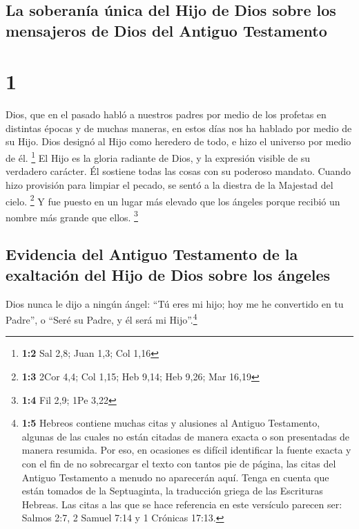 \hypertarget{la-soberanuxeda-uxfanica-del-hijo-de-dios-sobre-los-mensajeros-de-dios-del-antiguo-testamento}{%
\subsection{La soberanía única del Hijo de Dios sobre los mensajeros de
Dios del Antiguo
Testamento}\label{la-soberanuxeda-uxfanica-del-hijo-de-dios-sobre-los-mensajeros-de-dios-del-antiguo-testamento}}

\hypertarget{section}{%
\section{1}\label{section}}

 Dios, que en el pasado habló a nuestros padres por medio
de los profetas en distintas épocas y de muchas maneras, 
en estos días nos ha hablado por medio de su Hijo. Dios designó al Hijo
como heredero de todo, e hizo el universo por medio de él. \footnote{\textbf{1:2}
  Sal 2,8; Juan 1,3; Col 1,16}  El Hijo es la gloria
radiante de Dios, y la expresión visible de su verdadero carácter. Él
sostiene todas las cosas con su poderoso mandato. Cuando hizo provisión
para limpiar el pecado, se sentó a la diestra de la Majestad del cielo.
\footnote{\textbf{1:3} 2Cor 4,4; Col 1,15; Heb 9,14; Heb 9,26; Mar 16,19}
 Y fue puesto en un lugar más elevado que los ángeles
porque recibió un nombre más grande que ellos. \footnote{\textbf{1:4}
  Fil 2,9; 1Pe 3,22}

\hypertarget{evidencia-del-antiguo-testamento-de-la-exaltaciuxf3n-del-hijo-de-dios-sobre-los-uxe1ngeles}{%
\subsection{Evidencia del Antiguo Testamento de la exaltación del Hijo
de Dios sobre los
ángeles}\label{evidencia-del-antiguo-testamento-de-la-exaltaciuxf3n-del-hijo-de-dios-sobre-los-uxe1ngeles}}

 Dios nunca le dijo a ningún ángel: ``Tú eres mi hijo; hoy
me he convertido en tu Padre'', o ``Seré su Padre, y él será mi
Hijo''.\footnote{\textbf{1:5} Hebreos contiene muchas citas y alusiones
  al Antiguo Testamento, algunas de las cuales no están citadas de
  manera exacta o son presentadas de manera resumida. Por eso, en
  ocasiones es difícil identificar la fuente exacta y con el fin de no
  sobrecargar el texto con tantos pie de página, las citas del Antiguo
  Testamento a menudo no aparecerán aquí. Tenga en cuenta que están
  tomados de la Septuaginta, la traducción griega de las Escrituras
  Hebreas. Las citas a las que se hace referencia en este versículo
  parecen ser: Salmos 2:7, 2 Samuel 7:14 y 1 Crónicas 17:13.}


